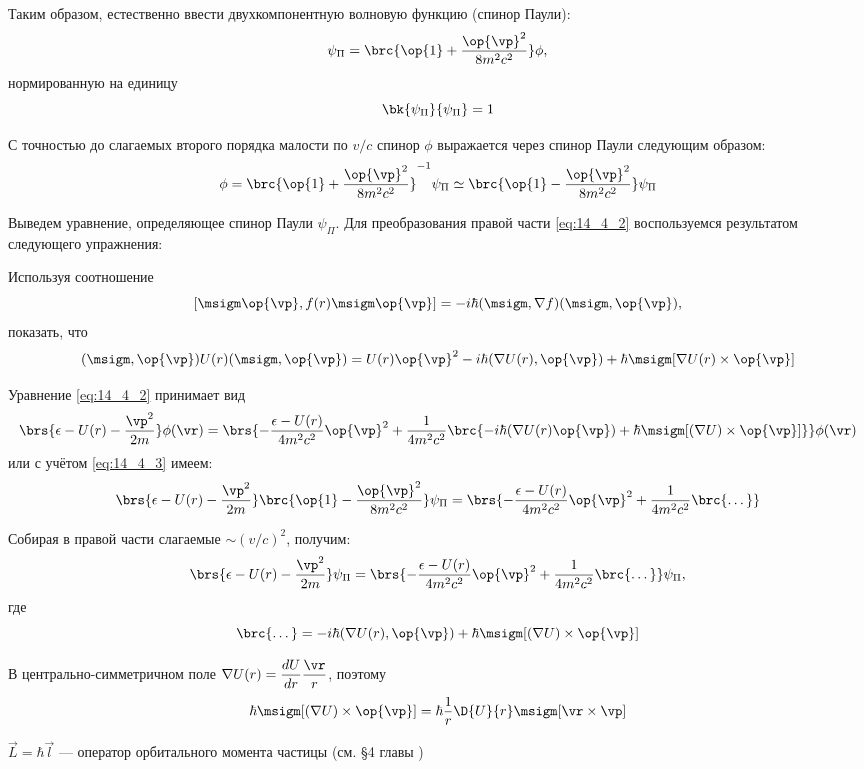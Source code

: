 Таким образом, естественно ввести двухкомпонентную волновую функцию (спинор Паули):
$$
\psi_\Pi = \brc{\op{1} + \frac{\op{\vp}^2}{8m^2c^2}} \phi,
$$
нормированную на единицу
$$
\bk{\psi_\Pi}{\psi_\Pi} = 1
$$

С точностью до слагаемых второго порядка малости по $v/c$ спинор $\phi$ выражается через спинор Паули следующим образом:
\begin{equation}
\label{eq:14_4_3}
\phi = \brc{\op{1} + \frac{\op{\vp}^2}{8m^2c^2}}^{-1} \psi_\Pi \simeq \brc{\op{1} - \frac{\op{\vp}^2}{8m^2c^2}} \psi_\Pi
\end{equation}

Выведем уравнение, определяющее спинор Паули $\psi_\Pi$. Для преобразования правой части \eqref{eq:14_4_2} воспользуемся результатом следующего упражнения:

\begin{excr}
Используя соотношение 
$$
[\msigm \op{\vp}, f(r) \msigm \op{\vp}] = -i\hbar (\msigm, \nabla f)(\msigm, \op{\vp}),
$$
показать, что
$$
(\msigm, \op{\vp}) U(r) (\msigm, \op{\vp}) = U(r) \op{\vp}^2 - i \hbar (\nabla U(r), \op{\vp}) + \hbar \msigm [\nabla U(r) \times \op{\vp}]
$$
\end{excr}

Уравнение \eqref{eq:14_4_2} принимает вид
$$
\brs{\epsilon - U(r) - \frac{{\vp}^2}{2m}}\phi(\vr) = \brs{- \frac{\epsilon - U(r)}{4m^2c^2}\op{\vp}^2 + \frac{1}{4m^2 c^2} \brc{-i\hbar (\nabla U(r) \op{\vp}) + \hbar \msigm [(\nabla U) \times \op{\vp}]}} \phi(\vr)
$$
или с учётом \eqref{eq:14_4_3} имеем:
$$
\brs{\epsilon - U(r) - \frac{{\vp}^2}{2m}}\brc{\op{1} - \frac{\op{\vp}^2}{8m^2c^2}} \psi_\Pi = \brs{- \frac{\epsilon - U(r)}{4m^2c^2}\op{\vp}^2 + \frac{1}{4m^2 c^2} \brc{\dots}}
$$

Собирая в правой части слагаемые $\sim (v/c)^2$, получим:
$$
\brs{\epsilon - U(r) - \frac{{\vp}^2}{2m}}\psi_\Pi = \brs{- \frac{\epsilon - U(r)}{4m^2c^2}\op{\vp}^2 + \frac{1}{4m^2 c^2} \brc{\dots}} \psi_\Pi,
$$
где 
\begin{equation}
\label{eq:14_4_4}
\brc{\dots} = -i\hbar (\nabla U(r), \op{\vp}) + \hbar \msigm [(\nabla U) \times \op{\vp}]
\end{equation}

В центрально-симметричном поле $\nabla U(r) = \dfrac{dU}{dr} \dfrac{\vr}{r}$, поэтому 
$$
\hbar \msigm [(\nabla U) \times \op{\vp}] = \hbar \frac{1}{r} \D{U}{r} \msigm [\vr \times \vp] 
$$

$\vec{L} = \hbar \vec{l}$ --- оператор орбитального момента частицы (см. \S 4 главы )

